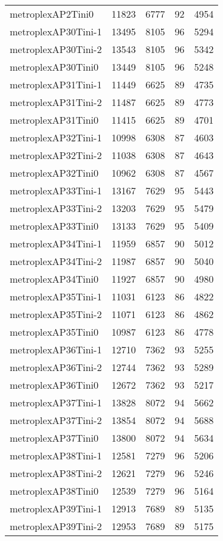 \begin{longtable}{lrrrr}
metroplexAP2Tini0 & 11823 & 6777 & 92 & 4954 \\
metroplexAP30Tini-1 & 13495 & 8105 & 96 & 5294 \\
metroplexAP30Tini-2 & 13543 & 8105 & 96 & 5342 \\
metroplexAP30Tini0 & 13449 & 8105 & 96 & 5248 \\
metroplexAP31Tini-1 & 11449 & 6625 & 89 & 4735 \\
metroplexAP31Tini-2 & 11487 & 6625 & 89 & 4773 \\
metroplexAP31Tini0 & 11415 & 6625 & 89 & 4701 \\
metroplexAP32Tini-1 & 10998 & 6308 & 87 & 4603 \\
metroplexAP32Tini-2 & 11038 & 6308 & 87 & 4643 \\
metroplexAP32Tini0 & 10962 & 6308 & 87 & 4567 \\
metroplexAP33Tini-1 & 13167 & 7629 & 95 & 5443 \\
metroplexAP33Tini-2 & 13203 & 7629 & 95 & 5479 \\
metroplexAP33Tini0 & 13133 & 7629 & 95 & 5409 \\
metroplexAP34Tini-1 & 11959 & 6857 & 90 & 5012 \\
metroplexAP34Tini-2 & 11987 & 6857 & 90 & 5040 \\
metroplexAP34Tini0 & 11927 & 6857 & 90 & 4980 \\
metroplexAP35Tini-1 & 11031 & 6123 & 86 & 4822 \\
metroplexAP35Tini-2 & 11071 & 6123 & 86 & 4862 \\
metroplexAP35Tini0 & 10987 & 6123 & 86 & 4778 \\
metroplexAP36Tini-1 & 12710 & 7362 & 93 & 5255 \\
metroplexAP36Tini-2 & 12744 & 7362 & 93 & 5289 \\
metroplexAP36Tini0 & 12672 & 7362 & 93 & 5217 \\
metroplexAP37Tini-1 & 13828 & 8072 & 94 & 5662 \\
metroplexAP37Tini-2 & 13854 & 8072 & 94 & 5688 \\
metroplexAP37Tini0 & 13800 & 8072 & 94 & 5634 \\
metroplexAP38Tini-1 & 12581 & 7279 & 96 & 5206 \\
metroplexAP38Tini-2 & 12621 & 7279 & 96 & 5246 \\
metroplexAP38Tini0 & 12539 & 7279 & 96 & 5164 \\
metroplexAP39Tini-1 & 12913 & 7689 & 89 & 5135 \\
metroplexAP39Tini-2 & 12953 & 7689 & 89 & 5175 \\

\end{longtable}
